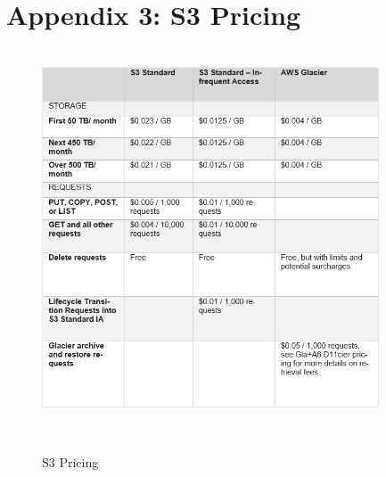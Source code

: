 \documentclass[runningheads]{llncs}
\begin{document}
\newpage
\section*{Appendix 3: S3 Pricing}

\begin{figure}[H]
    \centering
    \includegraphics[width=10cm]{pic/S3-pricing.png}
    \caption{S3 Pricing\cite{aws-s3-costs}}
    \label{S3 Pricing}
\end{figure}
\end{document}
